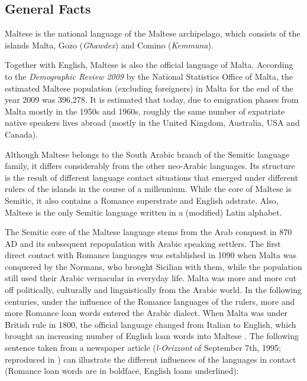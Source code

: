 \documentclass[]{../../metanetpaper}
\begin{document}
\clearpage


\begin{multicols}{2}

\subsection{General Facts}

Maltese is the national language of the Maltese archipelago, which consists of the islands Malta, Gozo (\emph{Għawdex}) and Comino (\emph{Kemmuna}).

Together with English, Maltese is also the official language of Malta. According to the \emph{Demographic Review 2009} by the National Statistics Office of Malta, the estimated Maltese population (excluding foreigners) in Malta for the end of the year 2009 was 396,278. It is estimated that today, due to emigration phases from Malta mostly in the 1950s and 1960s, roughly the same number of expatriate native speakers lives abroad (mostly in the United Kingdom, Australia, USA and Canada).

Although Maltese belongs to the South Arabic branch of the Semitic language family, it differs considerably from the other neo-Arabic languages. Its structure is the result of different language contact situations that emerged under different rulers of the islands in the course of a millennium. While the core of Maltese is Semitic, it also contains a Romance superstrate and English adstrate. Also, Maltese is the only Semitic language written in a (modified) Latin alphabet.

The Semitic core of the Maltese language stems from the Arab conquest in 870 AD and its subsequent repopulation with Arabic speaking settlers. The first direct contact with Romance languages was established in 1090 when Malta was conquered by the Normans, who brought Sicilian with them, while the population still used their Arabic vernacular in everyday life. Malta was more and more cut off politically, culturally and linguistically from the Arabic world. In the following centuries, under the influence of the Romance languages of the rulers, more and more Romance loan words entered the Arabic dialect. When Malta was under British rule in 1800, the official language changed from Italian to English, which brought an increasing number of English loan words into Maltese . The following sentence taken from a newspaper article (\emph{l-Orizzont} of September 7th, 1995; reproduced in \cite[p. 135]{Ambros:1998}) can illustrate the different influences of the languages in contact (Romance loan words are in boldface, English loans underlined):


\end{multicols}
\end{document}
